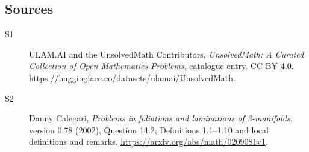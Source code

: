\documentclass[11pt]{article}
\begin{document}
\subsection{Sources}
\begin{description}
\item[\hypertarget{source:statement:1}{S1}] ULAM.AI and the UnsolvedMath Contributors, \emph{UnsolvedMath: A Curated Collection of Open Mathematics Problems}, catalogue entry. CC BY 4.0. \url{https://huggingface.co/datasets/ulamai/UnsolvedMath}.
\item[\hypertarget{source:statement:2}{S2}] Danny Calegari, \emph{Problems in foliations and laminations of 3-manifolds}, version 0.78 (2002), Question 14.2; Definitions 1.1--1.10 and local definitions and remarks. \url{https://arxiv.org/abs/math/0209081v1}.
\end{description}
\label{end:statement}
\end{document}
